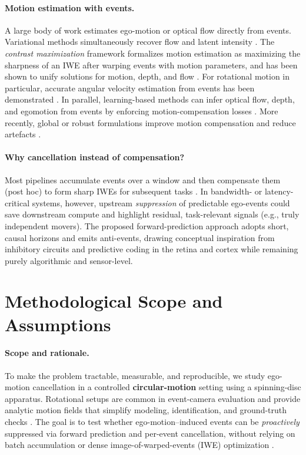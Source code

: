 \paragraph{Motion estimation with events.}
A large body of work estimates ego-motion or optical flow directly from events. Variational methods simultaneously recover flow and latent intensity \cite{Bardow2016SOFIE}. The \emph{contrast maximization} framework formalizes motion estimation as maximizing the sharpness of an IWE after warping events with motion parameters, and has been shown to unify solutions for motion, depth, and flow \cite{Gallego2018CMax}. For rotational motion in particular, accurate angular velocity estimation from events has been demonstrated \cite{Gallego2017Angular}. In parallel, learning-based methods can infer optical flow, depth, and egomotion from events by enforcing motion-compensation losses \cite{Zhu2019Unsupervised}. More recently, global or robust formulations improve motion compensation and reduce artefacts \cite{Xu2020SmoothMC}.

\paragraph{Why cancellation instead of compensation?}
Most pipelines accumulate events over a window and then compensate them (post hoc) to form sharp IWEs for subsequent tasks \cite{Gallego2018CMax,Stoffregen2019Segmentation}. In bandwidth- or latency-critical systems, however, upstream \emph{suppression} of predictable ego-events could save downstream compute and highlight residual, task-relevant signals (e.g., truly independent movers). The proposed forward-prediction approach adopts short, causal horizons and emits anti-events, drawing conceptual inspiration from inhibitory circuits and predictive coding in the retina and cortex \cite{Hosoya2005RetinaPC,Rao1999V1PC} while remaining purely algorithmic and sensor-level.

\section{Methodological Scope and Assumptions}
\label{sec:scope-assumptions}

\paragraph{Scope and rationale.}
To make the problem tractable, measurable, and reproducible, we study ego-motion cancellation in a controlled \textbf{circular-motion} setting using a spinning-disc apparatus. Rotational setups are common in event-camera evaluation and provide analytic motion fields that simplify modeling, identification, and ground-truth checks \cite{Gallego2017Angular,Stoffregen2019Segmentation}. The goal is to test whether ego-motion–induced events can be \emph{proactively} suppressed via forward prediction and per-event cancellation, without relying on batch accumulation or dense image-of-warped-events (IWE) optimization \cite{Gallego2018CMax,Bardow2016SOFIE}.

